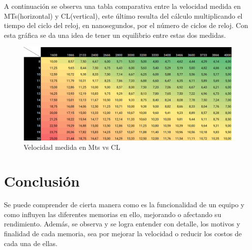 \documentclass{article}
\begin{document}
\noindent A continuación se observa una tabla comparativa entre la velocidad medida en MTs(horizontal) y CL(vertical), este último resulta del cálculo multiplicando el tiempo del ciclo del reloj, en nanosegundos, por el número de ciclos de reloj. Con esta gráfica se da una idea de tener un equilibrio entre estas dos medidas.

\begin{figure}[h]
\includegraphics[width=12cm]{latencia.png}
\centering
\caption{Velocidad medida en Mts vs CL}
\end{figure}

\section{Conclusión} \label{conclulsion}
\noindent Se puede comprender de cierta manera como es la funcionalidad de un equipo y como influyen las diferentes memorias en ello, mejorando o afectando su rendimiento. Además, se observa y se logra entender con detalle, los motivos y finalidad de cada memoria, sea por mejorar la velocidad o reducir los costos de cada una de ellas.



\end{document}
